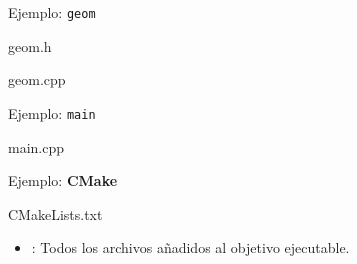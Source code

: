 \begin{frame}[t]{Ejemplo: \texttt{geom}}
\begin{block}{geom.h}

\end{block}
\begin{block}{geom.cpp}

\end{block}
\end{frame}

\begin{frame}[t]{Ejemplo: \texttt{main}}
\begin{block}{main.cpp}

\end{block}
\end{frame}

\begin{frame}[t]{Ejemplo: \textbf{CMake}}
\begin{block}{CMakeLists.txt}

\end{block}
\begin{itemize}
  \item {}: Todos los archivos  añadidos
        al objetivo ejecutable.
\end{itemize}
\end{frame}
